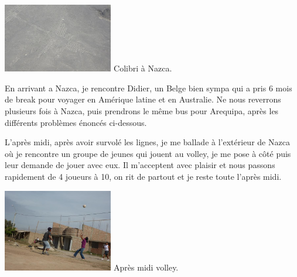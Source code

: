 \begin{multicols}{2}
\hspace*{-0.65cm}
\includegraphics[width=4.8cm]{articles/Cote-du-sud/1255996046TE4T.jpg}
Colibri à Nazca.


En arrivant a Nazca, je rencontre Didier, un Belge bien sympa qui a pris 6 mois de break pour voyager en Amérique latine et en Australie.  Ne nous reverrons plusieurs fois à Nazca, puis prendrons le même bus pour Arequipa, après les différents problèmes énoncés ci-dessous.

L'après midi, après avoir survolé les lignes, je me ballade à l'extérieur de Nazca où je rencontre un groupe de jeunes qui jouent au volley, je me pose à côté puis leur demande de jouer avec eux. Il m'acceptent avec plaisir et nous passons rapidement de 4 joueurs à 10, on rit de partout et je reste toute l'après midi.

\hspace*{-0.65cm}
\includegraphics[width=4.8cm]{articles/Cote-du-sud/1255996043Enc7.jpg}
Après midi volley.



\end{multicols}
